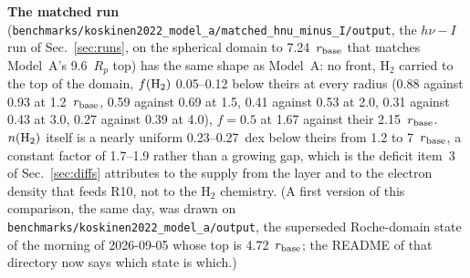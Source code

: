 \documentclass[english,a4paper]{my_memo}
\begin{document}
\textbf{The matched run}
(\texttt{benchmarks/koskinen2022\_model\_a/matched\_hnu\_minus\_I/output}, the
$h\nu - I$ run of Sec.~\ref{sec:runs}, on the spherical domain to
7.24~$r_{\rm base}$ that matches Model~A's 9.6~$R_p$ top) has the same shape
as Model~A: no front, H$_2$ carried to the top of the domain, $f({\rm H}_2)$
0.05--0.12 below theirs at every radius (0.88 against 0.93 at
1.2~$r_{\rm base}$, 0.59 against 0.69 at 1.5, 0.41 against 0.53 at 2.0, 0.31
against 0.43 at 3.0, 0.27 against 0.39 at 4.0), $f = 0.5$ at 1.67 against
their 2.15~$r_{\rm base}$. $n({\rm H}_2)$ itself is a nearly uniform
0.23--0.27~dex below theirs from 1.2 to 7~$r_{\rm base}$, a constant factor
of 1.7--1.9 rather than a growing gap, which is the deficit item~3 of
Sec.~\ref{sec:diffs} attributes to the supply from the layer and to the
electron density that feeds R10, not to the H$_2$ chemistry. (A first
version of this comparison, the same day, was drawn on
\texttt{benchmarks/koskinen2022\_model\_a/output}, the superseded
Roche-domain state of the morning of 2026-09-05 whose top is
4.72~$r_{\rm base}$; the README of that directory now says which state is
which.)
\end{document}
